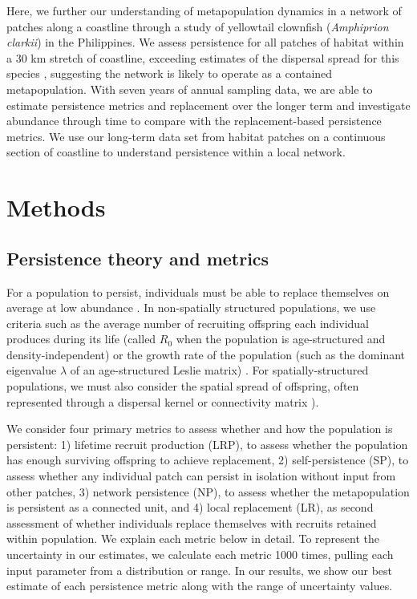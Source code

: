 \documentclass[12pt, oneside]{article}   	%
\begin{document}
Here, we further our understanding of metapopulation dynamics in a network of patches along a coastline through a study of yellowtail clownfish (\textit{Amphiprion clarkii}) in the Philippines. We assess persistence for all patches of habitat within a 30 km stretch of coastline, exceeding estimates of the dispersal spread for this species \citep{pinsky2010using}, suggesting the network is likely to operate as a contained metapopulation. With seven years of annual sampling data, we are able to estimate persistence metrics and replacement over the longer term and investigate abundance through time to compare with the replacement-based persistence metrics. We use our long-term data set from habitat patches on a continuous section of coastline to understand persistence within a local network. %

\section*{Methods} 

\subsection*{Persistence theory and metrics}

For a population to persist, individuals must be able to replace themselves on average at low abundance \citep[e.g.][]{hastings_persistence_2006,botsford_connectivity_2009}. In non-spatially structured populations, we use criteria such as the average number of recruiting offspring each individual produces during its life (called $R_0$ when the population is age-structured and density-independent) or the growth rate of the population (such as the dominant eigenvalue $\lambda$ of an age-structured Leslie matrix) \citep{caswell_matrix_2001, burgess2014beyond}. For spatially-structured populations, we must also consider the spatial spread of offspring, often represented through a dispersal kernel or connectivity matrix \citep[e.g.][]{cowen_scaling_2006, buston2011probability, hogan_local_2011, daloia2015patterns}). 

We consider four primary metrics to assess whether and how the population is persistent: 1) lifetime recruit production (LRP), to assess whether the population has enough surviving offspring to achieve replacement, 2) self-persistence (SP), to assess whether any individual patch can persist in isolation without input from other patches, 3) network persistence (NP), to assess whether the metapopulation is persistent as a connected unit, and 4) local replacement (LR), as second assessment of whether individuals replace themselves with recruits retained within population. We explain each metric below in detail. To represent the uncertainty in our estimates, we calculate each metric 1000 times, pulling each input parameter from a distribution or range. In our results, we show our best estimate of each persistence metric along with the range of uncertainty values. %
\end{document}
